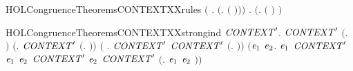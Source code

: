 \begin{SaveVerbatim}{HOLCongruenceTheoremsCONTEXTXXrules}
   \ensuremath{(}\HOLSymConst{\HOLTokenForall{}} .   \HOLSymConst{\HOLTokenImp{}}  \ensuremath{(}\HOLTokenLambda{}.   \ensuremath{(} \ensuremath{)}\ensuremath{)}\ensuremath{)} \HOLSymConst{\HOLTokenConj{}}
   \HOLSymConst{\HOLTokenForall{}} .   \HOLSymConst{\HOLTokenImp{}}  \ensuremath{(}\HOLTokenLambda{}.  \ensuremath{(} \ensuremath{)} \ensuremath{)}
\end{SaveVerbatim}
\newcommand{\HOLCongruenceTheoremsCONTEXTXXrules}{\UseVerbatim{HOLCongruenceTheoremsCONTEXTXXrules}}
\begin{SaveVerbatim}{HOLCongruenceTheoremsCONTEXTXXstrongind}
\HOLTokenTurnstile{} \HOLSymConst{\HOLTokenForall{}}\ensuremath{\HOLBoundVar{CONTEXT}\sp{\prime}}.
       \ensuremath{\HOLBoundVar{CONTEXT}\sp{\prime}} \ensuremath{(}\HOLTokenLambda{}. \ensuremath{)} \HOLSymConst{\HOLTokenConj{}} \ensuremath{(}\HOLSymConst{\HOLTokenForall{}}. \ensuremath{\HOLBoundVar{CONTEXT}\sp{\prime}} \ensuremath{(}\HOLTokenLambda{}. \ensuremath{)}\ensuremath{)} \HOLSymConst{\HOLTokenConj{}}
       \ensuremath{(}\HOLSymConst{\HOLTokenForall{}} .   \HOLSymConst{\HOLTokenConj{}} \ensuremath{\HOLBoundVar{CONTEXT}\sp{\prime}}  \HOLSymConst{\HOLTokenImp{}} \ensuremath{\HOLBoundVar{CONTEXT}\sp{\prime}} \ensuremath{(}\HOLTokenLambda{}. \HOLSymConst{\ensuremath{\ldotp}} \ensuremath{)}\ensuremath{)} \HOLSymConst{\HOLTokenConj{}}
       \ensuremath{(}\HOLSymConst{\HOLTokenForall{}}\ensuremath{\HOLBoundVar{e}\sb{\mathrm{1}}} \ensuremath{\HOLBoundVar{e}\sb{\mathrm{2}}}.
             \ensuremath{\HOLBoundVar{e}\sb{\mathrm{1}}} \HOLSymConst{\HOLTokenConj{}} \ensuremath{\HOLBoundVar{CONTEXT}\sp{\prime}} \ensuremath{\HOLBoundVar{e}\sb{\mathrm{1}}} \HOLSymConst{\HOLTokenConj{}}  \ensuremath{\HOLBoundVar{e}\sb{\mathrm{2}}} \HOLSymConst{\HOLTokenConj{}} \ensuremath{\HOLBoundVar{CONTEXT}\sp{\prime}} \ensuremath{\HOLBoundVar{e}\sb{\mathrm{2}}} \HOLSymConst{\HOLTokenImp{}}
            \ensuremath{\HOLBoundVar{CONTEXT}\sp{\prime}} \ensuremath{(}\HOLTokenLambda{}. \ensuremath{\HOLBoundVar{e}\sb{\mathrm{1}}}  \HOLSymConst{\ensuremath{+}} \ensuremath{\HOLBoundVar{e}\sb{\mathrm{2}}} \ensuremath{)}\ensuremath{)} \HOLSymConst{\HOLTokenConj{}}

\end{SaveVerbatim}
